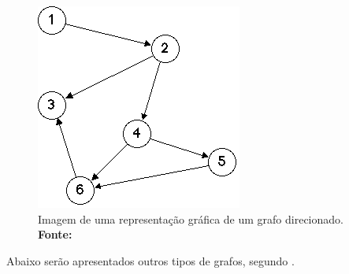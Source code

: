 \begin{figure}[h!]
	\centerline{\includegraphics[scale=0.6]{./imagens/simple_digraph_graph.png}}
	\caption[Imagem de uma representação gráfica de um grafo direcionado]
	{Imagem de uma representação gráfica de um grafo direcionado. \textbf{Fonte:} }
	\label{fig:exemplo1}
\end{figure}

Abaixo serão apresentados outros tipos de grafos, segundo .

